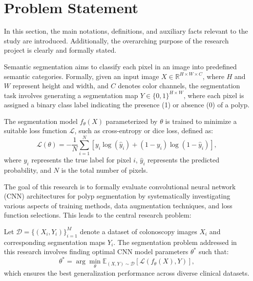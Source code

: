 \chapter{Problem Statement}

In this section, the main notations, definitions, and auxiliary facts relevant to the study are introduced. Additionally, the overarching purpose of the research project is clearly and formally stated.

Semantic segmentation aims to classify each pixel in an image into predefined semantic categories. Formally, given an input image \( X \in \mathbb{R}^{H \times W \times C} \), where \(H\) and \(W\) represent height and width, and \(C\) denotes color channels, the segmentation task involves generating a segmentation map \( Y \in \{0,1\}^{H \times W} \), where each pixel is assigned a binary class label indicating the presence (1) or absence (0) of a polyp.

The segmentation model \( f_{\theta}(X) \) parameterized by \(\theta\) is trained to minimize a suitable loss function \(\mathcal{L}\), such as cross-entropy or dice loss, defined as:
\begin{equation}
    \mathcal{L}(\theta) = - \frac{1}{N}\sum_{i=1}^{N}[y_i \log(\hat{y}_i) + (1 - y_i)\log(1 - \hat{y}_i)],
    \label{eq::cross_entropy}
\end{equation}
where \( y_i \) represents the true label for pixel \( i \), \( \hat{y}_i \) represents the predicted probability, and \(N\) is the total number of pixels.

The goal of this research is to formally evaluate convolutional neural network (CNN) architectures for polyp segmentation by systematically investigating various aspects of training methods, data augmentation techniques, and loss function selections. This leads to the central research problem:

\begin{Def}
  Let \(\mathcal{D} = \{(X_i, Y_i)\}_{i=1}^{M}\) denote a dataset of colonoscopy images \(X_i\) and corresponding segmentation maps \(Y_i\). The segmentation problem addressed in this research involves finding optimal CNN model parameters \(\theta^*\) such that:
  \begin{equation}
      \theta^* = \arg\min_{\theta} \mathbb{E}_{(X,Y)\sim\mathcal{D}}[\mathcal{L}(f_{\theta}(X), Y)],
      \label{eq::optimal_theta}
  \end{equation}
  which ensures the best generalization performance across diverse clinical datasets.
\end{Def}

